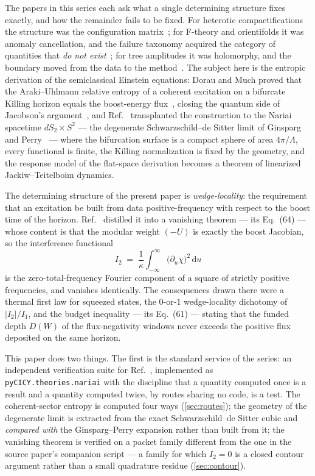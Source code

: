 \documentclass[11pt,a4paper]{article}
\newcommand{\dd}{\mathrm{d}}
\theoremstyle{plain}
\theoremstyle{definition}
\begin{document}
The papers in this series each ask what a single determining structure fixes
exactly, and how the remainder fails to be fixed. For heterotic
compactifications the structure was the configuration
matrix~\cite{SuppMath}; for F-theory and orientifolds it was anomaly
cancellation, and the failure taxonomy acquired the category of quantities
that \emph{do not exist}~\cite{SuppStrings}; for tree amplitudes it was
holomorphy, and the boundary moved from the data to the
method~\cite{SuppTwistor}. The subject here is the entropic derivation of the
semiclassical Einstein equations: Dorau and Much proved that the
Araki--Uhlmann relative entropy of a coherent excitation on a bifurcate
Killing horizon equals the boost-energy flux~\cite{DorauMuch}, closing the
quantum side of Jacobson's argument~\cite{Jacobson1995}, and
Ref.~\cite{NariaiI} transplanted the construction to the Nariai spacetime
$dS_2 \times S^2$ --- the degenerate Schwarzschild--de Sitter limit of
Ginsparg and Perry~\cite{GinspargPerry} --- where the bifurcation surface is
a compact sphere of area $4\pi/\Lambda$, every functional is finite, the
Killing normalization is fixed by the geometry, and the response model of the
flat-space derivation becomes a theorem of linearized Jackiw--Teitelboim
dynamics.

The determining structure of the present paper is \emph{wedge-locality}: the
requirement that an excitation be built from data positive-frequency with
respect to the boost time of the horizon. Ref.~\cite{NariaiI} distilled it
into a vanishing theorem --- its Eq.~(64) --- whose content is that the
modular weight $(-U)$ is exactly the boost Jacobian, so the interference
functional
%
\begin{equation}
I_2 \;=\; \frac{1}{\kappa}\int_{-\infty}^{\infty}
\bigl(\partial_u \chi\bigr)^2\, \dd u
\label{eq:i2}
\end{equation}
%
is the zero-total-frequency Fourier component of a square of strictly
positive frequencies, and vanishes identically. The consequences drawn there
were a thermal first law for squeezed states, the $0$-or-$1$ wedge-locality
dichotomy of $|I_2|/I_1$, and the budget inequality --- its Eq.~(61) ---
stating that the funded depth $D(W)$ of the flux-negativity windows never
exceeds the positive flux deposited on the same horizon.

This paper does two things. The first is the standard service of the series:
an independent verification suite for Ref.~\cite{NariaiI}, implemented as
\texttt{pyCICY.theories.nariai} with the discipline that a quantity computed
once is a result and a quantity computed twice, by routes sharing no code, is
a test. The coherent-sector entropy is computed four ways
(\cref{sec:routes}); the geometry of the degenerate limit is extracted from
the exact Schwarzschild--de Sitter cubic and \emph{compared with} the
Ginsparg--Perry expansion rather than built from it; the vanishing theorem is
verified on a packet family different from the one in the source paper's
companion script --- a family for which $I_2 = 0$ is a closed contour
argument rather than a small quadrature residue (\cref{sec:contour}).
\end{document}
